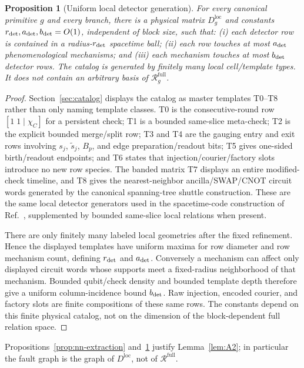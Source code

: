 \documentclass[aps,prx,reprint,superscriptaddress,nofootinbib,floatfix,longbibliography]{revtex4-2}
\newtheorem{proposition}[theorem]{Proposition}
\theoremstyle{definition}
\begin{document}
\begin{proposition}[Uniform local detector generation]
\label{prop:uniform-local-detectors}
For every canonical primitive $g$ and every branch, there is a physical
matrix $D_g^{\mathrm{loc}}$ and constants
$r_{\rm det},a_{\rm det},b_{\rm det}=O(1)$, independent of block size, such
that: (i) each detector row is contained in a radius-$r_{\rm det}$ spacetime
ball; (ii) each row touches at most $a_{\rm det}$ phenomenological mechanisms;
and (iii) each mechanism touches at most $b_{\rm det}$ detector rows.
The catalog is generated by finitely many local cell/template types.  It does
not contain an arbitrary basis of $\mathcal R_g^{\mathrm{full}}$.
\end{proposition}
\begin{proof}
Section~\ref{sec:catalog} displays the catalog as master templates T0--T8 rather
than only naming template classes.  T0 is the consecutive-round row
$[1\;1\mid\chi_C]$ for a persistent check; T1 is a bounded same-slice
meta-check; T2 is the explicit bounded merge/split row; T3 and T4 are the
gauging entry and exit rows involving $s_j$, $\widetilde s_j$, $B_p$, and
edge preparation/readout bits; T5 gives one-sided birth/readout endpoints;
and T6 states that injection/courier/factory slots introduce no new row
species.  The banded matrix T7 displays an entire modified-check timeline, and
T8 gives the nearest-neighbor ancilla/SWAP/CNOT circuit words generated by the canonical spanning-tree shuttle construction.  These are the
same local detector generators used in the spacetime-code construction of
Ref.~\cite{WilliamsonYoderGauging}, supplemented by bounded same-slice local
relations when present.

There are only finitely many labeled local geometries after the fixed
refinement.  Hence the displayed templates have uniform maxima for row
diameter and row mechanism count, defining $r_{\rm det}$ and $a_{\rm det}$.
Conversely a mechanism can affect only displayed circuit words whose supports
meet a fixed-radius neighborhood of that mechanism.  Bounded qubit/check
density and bounded template depth therefore give a uniform column-incidence
bound $b_{\rm det}$.  Raw injection, encoded courier, and factory slots
are finite compositions of these same rows.  The constants depend on this
finite physical catalog, not on the dimension of the block-dependent full
relation space.
\end{proof}

Propositions~\ref{prop:nn-extraction} and~\ref{prop:uniform-local-detectors}
justify Lemma~\ref{lem:A2}; in particular the fault graph is the graph of
$D^{\mathrm{loc}}$, not of $\mathcal R^{\mathrm{full}}$.
\end{document}
